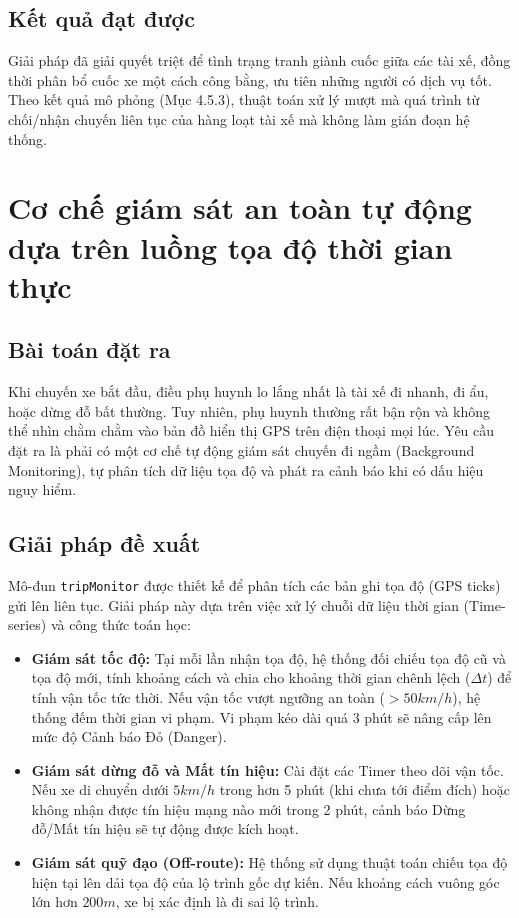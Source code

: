 \documentclass[../DoAn.tex]{subfiles}
\begin{document}
\subsection{Kết quả đạt được}
Giải pháp đã giải quyết triệt để tình trạng tranh giành cuốc giữa các tài xế, đồng thời phân bổ cuốc xe một cách công bằng, ưu tiên những người có dịch vụ tốt. Theo kết quả mô phỏng (Mục 4.5.3), thuật toán xử lý mượt mà quá trình từ chối/nhận chuyến liên tục của hàng loạt tài xế mà không làm gián đoạn hệ thống.

\section{Cơ chế giám sát an toàn tự động dựa trên luồng tọa độ thời gian thực}
\subsection{Bài toán đặt ra}
Khi chuyến xe bắt đầu, điều phụ huynh lo lắng nhất là tài xế đi nhanh, đi ẩu, hoặc dừng đỗ bất thường. Tuy nhiên, phụ huynh thường rất bận rộn và không thể nhìn chằm chằm vào bản đồ hiển thị GPS trên điện thoại mọi lúc. Yêu cầu đặt ra là phải có một cơ chế tự động giám sát chuyến đi ngầm (Background Monitoring), tự phân tích dữ liệu tọa độ và phát ra cảnh báo khi có dấu hiệu nguy hiểm.

\subsection{Giải pháp đề xuất}
Mô-đun \texttt{tripMonitor} được thiết kế để phân tích các bản ghi tọa độ (GPS ticks) gửi lên liên tục. Giải pháp này dựa trên việc xử lý chuỗi dữ liệu thời gian (Time-series) và công thức toán học:
\begin{itemize}
    \item \textbf{Giám sát tốc độ:} Tại mỗi lần nhận tọa độ, hệ thống đối chiếu tọa độ cũ và tọa độ mới, tính khoảng cách và chia cho khoảng thời gian chênh lệch ($\Delta t$) để tính vận tốc tức thời. Nếu vận tốc vượt ngưỡng an toàn ($> 50km/h$), hệ thống đếm thời gian vi phạm. Vi phạm kéo dài quá 3 phút sẽ nâng cấp lên mức độ Cảnh báo Đỏ (Danger).
    \item \textbf{Giám sát dừng đỗ và Mất tín hiệu:} Cài đặt các Timer theo dõi vận tốc. Nếu xe di chuyển dưới $5km/h$ trong hơn 5 phút (khi chưa tới điểm đích) hoặc không nhận được tín hiệu mạng nào mới trong 2 phút, cảnh báo Dừng đỗ/Mất tín hiệu sẽ tự động được kích hoạt.
    \item \textbf{Giám sát quỹ đạo (Off-route):} Hệ thống sử dụng thuật toán chiếu tọa độ hiện tại lên dải tọa độ của lộ trình gốc dự kiến. Nếu khoảng cách vuông góc lớn hơn $200m$, xe bị xác định là đi sai lộ trình.
\end{itemize}
\end{document}
